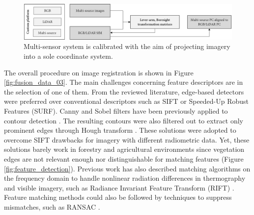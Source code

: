 \begin{figure}[!ht]
	\includegraphics[width=\linewidth]{figs/context/fusion_04.png}
	\caption{Multi-sensor system is calibrated with the aim of projecting imagery into a sole coordinate system.}
    \label{fig:fusion_data_04}
\end{figure}

The overall procedure on image registration is shown in Figure \ref{fig:fusion_data_03}. The main challenges concerning feature descriptors are in the selection of one of them. From the reviewed literature, edge-based detectors were preferred over conventional descriptors such as SIFT or Speeded-Up Robust Features (SURF). Canny and Sobel filters have been previously applied to contour detection \cite{hoegner_3d_2016, hoegner_evaluation_2016}. The resulting contours were also filtered out to extract only prominent edges through Hough transform \cite{hoegner_evaluation_2016}. These solutions were adopted to overcome SIFT drawbacks for imagery with different radiometric data. Yet, these solutions barely work in forestry and agricultural environments since vegetation edges are not relevant enough nor distinguishable for matching features (Figure \ref{fig:feature_detection}). Previous work has also described matching algorithms on the frequency domain to handle nonlinear radiation differences in thermography and visible imagery, such as Radiance Invariant Feature Transform (RIFT) \cite{lin_fusion_2019}. Feature matching methods could also be followed by techniques to suppress mismatches, such as RANSAC \cite{lin_fusion_2019}.

